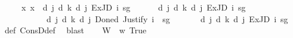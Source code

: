 \begin{isabellebody}
\ \ \ {\isachardoublequoteopen}{\isasymGamma}\ {\isasymequiv}\ {\isacharparenleft}{\kern0pt}{\isasymlambda}x{\isachardot}{\kern0pt}\ x\ {\isacharequal}{\kern0pt}\ {\isasymD}\isactrlsup d\ j\ {\isacharparenleft}{\kern0pt}{\isasymB}\isactrlsup d\ k\ {\isacharparenleft}{\kern0pt}{\isasymD}\isactrlsup d\ j\ {\isacharparenleft}{\kern0pt}ExJD\ i\ sg\ {\isasymphi}{\isacharparenright}{\kern0pt}{\isacharparenright}{\kern0pt}{\isacharparenright}{\kern0pt}{\isacharparenright}{\kern0pt}{\isachardoublequoteclose}\isanewline
\ \ \ {\isachardoublequoteopen}{\isacharparenleft}{\kern0pt}{\isasymGamma}\ {\isasymTurnstile}\ {\isasymD}\isactrlsup d\ j\ {\isacharparenleft}{\kern0pt}{\isasymB}\isactrlsup d\ k\ {\isacharparenleft}{\kern0pt}{\isasymD}\isactrlsup d\ j\ {\isacharparenleft}{\kern0pt}ExJD\ i\ sg\ {\isasymphi}{\isacharparenright}{\kern0pt}{\isacharparenright}{\kern0pt}{\isacharparenright}{\kern0pt}{\isacharparenright}{\kern0pt}\isanewline
\ \ \ \ \ \ \ {\isasymand}\ {\isasymnot}{\isacharparenleft}{\kern0pt}{\isasymexists}{\isasymDelta}{\isachardot}{\kern0pt}\ {\isasymGamma}\ {\isasymTurnstile}\ {\isasymD}\isactrlsup d\ j\ {\isacharparenleft}{\kern0pt}{\isasymB}\isactrlsup d\ k\ {\isacharparenleft}{\kern0pt}{\isasymD}\isactrlsup d\ j\ {\isacharparenleft}{\kern0pt}Done\isactrlsup d\ {\isacharparenleft}{\kern0pt}Justify\ i\ {\isasymDelta}\ sg\ {\isasymphi}{\isacharparenright}{\kern0pt}{\isacharparenright}{\kern0pt}{\isacharparenright}{\kern0pt}{\isacharparenright}{\kern0pt}{\isacharparenright}{\kern0pt}{\isachardoublequoteclose}\isanewline
%
\isadelimproof
%
\endisadelimproof
%
\isatagproof
{}\isamarkupfalse%
\isanewline
\ \ \isamarkupfalse%
\ {\isachardoublequoteopen}{\isasymGamma}\ {\isasymTurnstile}\ {\isasymD}\isactrlsup d\ j\ {\isacharparenleft}{\kern0pt}{\isasymB}\isactrlsup d\ k\ {\isacharparenleft}{\kern0pt}{\isasymD}\isactrlsup d\ j\ {\isacharparenleft}{\kern0pt}ExJD\ i\ sg\ {\isasymphi}{\isacharparenright}{\kern0pt}{\isacharparenright}{\kern0pt}{\isacharparenright}{\kern0pt}{\isachardoublequoteclose}\ \isamarkupfalse%
\ {\isasymGamma}{\isacharunderscore}{\kern0pt}def\ ConsD{\isacharunderscore}{\kern0pt}def\ \isamarkupfalse%
\ blast\isanewline
{}\isamarkupfalse%
\isanewline
\ \ \isamarkupfalse%
\ {\isacharquery}{\kern0pt}W\ {\isacharequal}{\kern0pt}\ {\isachardoublequoteopen}{\isasymlambda}w{\isacharcolon}{\kern0pt}{\isacharcolon}{\kern0pt}{\isasymw}{\isachardot}{\kern0pt}\ True{\isachardoublequoteclose}\isanewline

\end{isabellebody}
